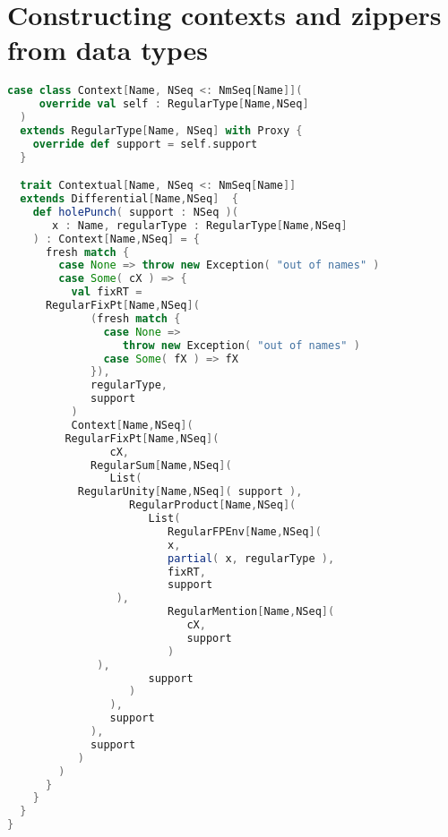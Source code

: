 \section{Constructing contexts and zippers from data types}

\begin{lstlisting}[language=Scala]
  case class Context[Name, NSeq <: NmSeq[Name]](
     override val self : RegularType[Name,NSeq]
  )
  extends RegularType[Name, NSeq] with Proxy {
    override def support = self.support
  }

  trait Contextual[Name, NSeq <: NmSeq[Name]]
  extends Differential[Name,NSeq]  {
    def holePunch( support : NSeq )(
       x : Name, regularType : RegularType[Name,NSeq]
    ) : Context[Name,NSeq] = {
      fresh match {
        case None => throw new Exception( "out of names" )
        case Some( cX ) => {
          val fixRT =
	  RegularFixPt[Name,NSeq](
             (fresh match {
               case None =>
                  throw new Exception( "out of names" )
               case Some( fX ) => fX
             }),
             regularType,
             support
          )
          Context[Name,NSeq](
	     RegularFixPt[Name,NSeq](
                cX,
             RegularSum[Name,NSeq](
                List(
		   RegularUnity[Name,NSeq]( support ),
                   RegularProduct[Name,NSeq](
                      List(
                         RegularFPEnv[Name,NSeq](
                         x,
                         partial( x, regularType ),
                         fixRT,
                         support
		         ),
                         RegularMention[Name,NSeq](
                            cX,
                            support
                         )
		      ),
                      support
                   )
                ),
                support
             ),
             support
           )
        )
      }
    }
  }
}
\end{lstlisting}

